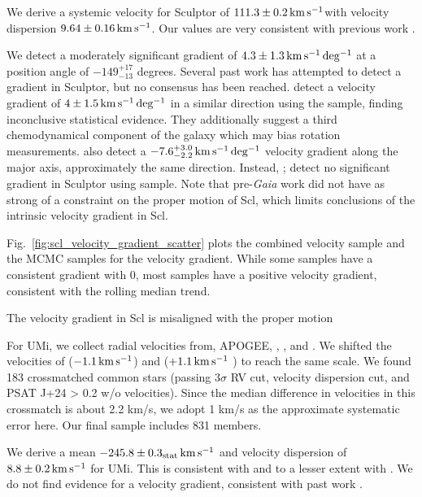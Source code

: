 We derive a systemic velocity for Sculptor of \(111.3\pm0.2\,{\rm km\,s^{-1}}\)with
velocity dispersion \(9.64\pm0.16\,{\rm km\,s^{-1}}\). Our values are very
consistent with previous work \citep[e.g.][\citet{arroyo-polonio+2024},
\citet{battaglia+2008}]{walker+2009}.

We detect a moderately significant gradient of \(4.3\pm1.3\,{\rm km\,s^{-1}\,deg^{-1}}\) at
a position angle of \(-149_{-13}^{+17}\) degrees. Several past work has
attempted to detect a gradient in Sculptor, but no consensus has been
reached. \citet{arroyo-polonio+2024} detect a velocity gradient of
\(4\pm1.5\,{\rm km\,s^{-1}\,deg^{-1}}\) in a similar direction using the
\citet{tolstoy+2023} sample, finding inconclusive statistical evidence.
They additionally suggest a third chemodynamical component of the galaxy
which may bias rotation measurements. \citet{battaglia+2008} also detect
a \(-7.6_{-2.2}^{+3.0}\,{\rm km\,s^{-1}\,deg^{-1}}\) velocity gradient along the major
axis, approximately the same direction. Instead, \citet{strigari2010};
\citet{martinez-garcia+2023} detect no significant gradient in Sculptor
using \citet{WMO2009} sample. Note that pre-\emph{Gaia} work did not
have as strong of a constraint on the proper motion of Scl, which limits
conclusions of the intrinsic velocity gradient in Scl.

Fig.~\ref{fig:scl_velocity_gradient_scatter} plots the combined velocity
sample and the MCMC samples for the velocity gradient. While some
samples have a consistent gradient with 0, most samples have a positive
velocity gradient, consistent with the rolling median trend.

The velocity gradient in Scl is misaligned with the proper motion

For UMi, we collect radial velocities from, APOGEE,
\citet{sestito+2023b}, \citet{pace+2020}, and \citet{spencer+2018}. We
shifted the velocities of \citet{spencer+2018} (\(-1.1\,{\rm km\,s^{-1}}\)) and
\citet{pace+2020} (\(+1.1\,{\rm km\,s^{-1}}\) ) to reach the same scale. We found
183 crossmatched common stars (passing 3\(\sigma\) RV cut, velocity
dispersion cut, and PSAT J+24 \textgreater{} 0.2 w/o velocities). Since
the median difference in velocities in this crossmatch is about 2.2
km/s, we adopt 1 km/s as the approximate systematic error here. Our
final sample includes 831 members.

We derive a mean \(-245.8\pm0.3_{\rm stat}\,{\rm km\,s^{-1}}\) and velocity
dispersion of \(8.8\pm0.2\,{\rm km\,s^{-1}}\) for UMi. This is consistent with
\citet{pace+2020} and to a lesser extent with \citet{spencer+2018}. We
do not find evidence for a velocity gradient, consistent with past work
\citep{pace+2020, martinez-garcia+2023}.

